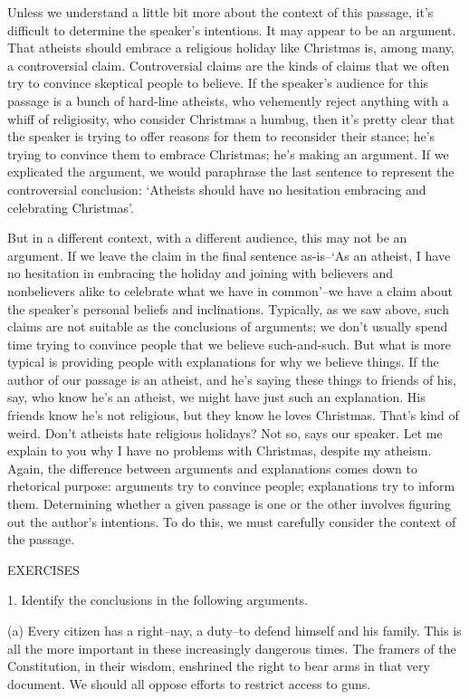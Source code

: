 Unless we understand a little bit more about the context of this passage, it's difficult to determine
the speaker's intentions. It may appear to be an argument. That atheists should embrace a religious
holiday like Christmas is, among many, a controversial claim. Controversial claims are the kinds
of claims that we often try to convince skeptical people to believe. If the speaker's audience for
this passage is a bunch of hard-line atheists, who vehemently reject anything with a whiff of
religiosity, who consider Christmas a humbug, then it's pretty clear that the speaker is trying to
offer reasons for them to reconsider their stance; he's trying to convince them to embrace
Christmas; he's making an argument. If we explicated the argument, we would paraphrase the last
sentence to represent the controversial conclusion: `Atheists should have no hesitation embracing
and celebrating Christmas'.

But in a different context, with a different audience, this may not be an argument. If we leave the
claim in the final sentence as-is--`As an atheist, I have no hesitation in embracing the holiday and
joining with believers and nonbelievers alike to celebrate what we have in common'--we have a
claim about the speaker's personal beliefs and inclinations. Typically, as we saw above, such
claims are not suitable as the conclusions of arguments; we don't usually spend time trying to
convince people that we believe such-and-such. But what is more typical is providing people with
explanations for why we believe things. If the author of our passage is an atheist, and he's saying
these things to friends of his, say, who know he's an atheist, we might have just such an
explanation. His friends know he's not religious, but they know he loves Christmas. That's kind
of weird. Don't atheists hate religious holidays? Not so, says our speaker. Let me explain to you
why I have no problems with Christmas, despite my atheism.
Again, the difference between arguments and explanations comes down to rhetorical purpose:
arguments try to convince people; explanations try to inform them. Determining whether a given
passage is one or the other involves figuring out the author's intentions. To do this, we must
carefully consider the context of the passage.

EXERCISES

1. Identify the conclusions in the following arguments.

(a) Every citizen has a right--nay, a duty--to defend himself and his family. This is all
the more important in these increasingly dangerous times. The framers of the Constitution,
in their wisdom, enshrined the right to bear arms in that very document. We should all
oppose efforts to restrict access to guns.

